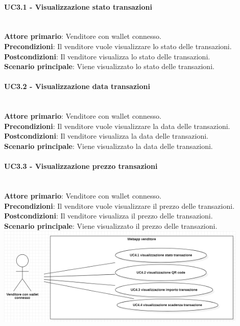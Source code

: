 \documentclass[a4paper, 12pt]{article}
\begin{document}
\paragraph{UC3.1 - Visualizzazione stato transazioni}\\
\textbf{Attore primario}: Venditore con wallet connesso.\\
\textbf{Precondizioni}: Il venditore vuole visualizzare lo stato delle transazioni.\\
\textbf{Postcondizioni}: Il venditore visualizza lo stato delle transazioni.\\
\textbf{Scenario principale}: Viene visualizzato lo stato delle transazioni.\\

\paragraph{UC3.2 - Visualizzazione data transazioni}\\
\textbf{Attore primario}: Venditore con wallet connesso.\\
\textbf{Precondizioni}: Il venditore vuole visualizzare la data delle transazioni.\\
\textbf{Postcondizioni}: Il venditore visualizza la data delle transazioni.\\
\textbf{Scenario principale}: Viene visualizzato la data delle transazioni.\\

\paragraph{UC3.3 - Visualizzazione prezzo transazioni}\\
\textbf{Attore primario}: Venditore con wallet connesso.\\
\textbf{Precondizioni}: Il venditore vuole visualizzare il prezzo delle transazioni.\\
\textbf{Postcondizioni}: Il venditore visualizza il prezzo delle transazioni.\\
\textbf{Scenario principale}: Viene visualizzato il prezzo delle transazioni.\\



\includegraphics[width=0.9\textwidth]{UC_WAV4}
\end{document}
